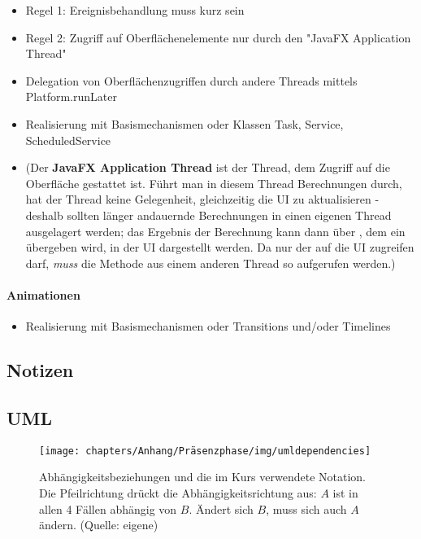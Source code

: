 \begin{itemize}
    \item Regel 1: Ereignisbehandlung muss kurz sein
    \item Regel 2: Zugriff auf Oberflächenelemente nur durch den "JavaFX Application Thread"
    \item Delegation von Oberflächenzugriffen durch andere Threads mittels Platform.runLater
    \item Realisierung mit Basismechanismen oder Klassen Task, Service, ScheduledService
    \item[] (Der \textbf{JavaFX Application Thread} ist der Thread, dem Zugriff auf die Oberfläche gestattet ist. Führt man in diesem Thread Berechnungen durch, hat der Thread keine Gelegenheit, gleichzeitig die UI zu aktualisieren - deshalb sollten länger andauernde Berechnungen in einen eigenen Thread ausgelagert werden; das Ergebnis der Berechnung kann dann über , dem ein  übergeben wird, in der UI dargestellt werden. Da nur der  auf die UI zugreifen darf, \textit{muss} die Methode aus einem anderen Thread so aufgerufen werden.)
\end{itemize}

\paragraph*{Animationen}

\begin{itemize}
    \item Realisierung mit Basismechanismen oder Transitions und/oder Timelines
\end{itemize}




\subsection{Notizen}

\subsection*{UML}

\begin{figure}
    \centering
    \texttt{[image: chapters/Anhang/Präsenzphase/img/umldependencies]}
    \caption{Abhängigkeitsbeziehungen und die im Kurs verwendete Notation.
    Die Pfeilrichtung drückt die Abhängigkeitsrichtung aus: $A$ ist in allen 4 Fällen abhängig von $B$. Ändert sich $B$, muss sich auch $A$ ändern. (Quelle: eigene)}
    \label{fig:umldependencies}
\end{figure}


